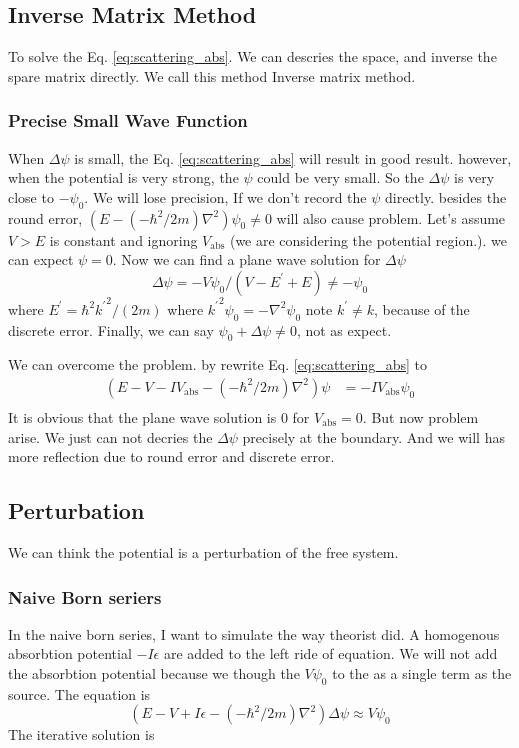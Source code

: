 \documentclass[12pt,twoside]{article}
\begin{document}
\subsection{Inverse Matrix Method}
To solve the Eq. \ref{eq:scattering_abs}. We can descries the space, and inverse the spare matrix directly. We call this method Inverse matrix method.


\subsubsection{Precise Small Wave Function}
When $\Delta \psi$ is small, the Eq. \ref{eq:scattering_abs} will result in good result. however, when the potential is very strong, the $\psi$ could be very small. So the $\Delta \psi$ is very close to $-\psi_0$. We will lose precision, If we don't record the $\psi$ directly. besides the round error, $(E-(-\hbar^2/2m)\nabla^2)\psi_0 \neq 0$ will also cause problem. Let's assume $V > E$ is constant and ignoring $V_\text{abs}$ (we are considering the potential region.). we can expect $\psi=0$. Now we can find a plane wave solution for $\Delta\psi$
$$
\Delta\psi = -V\psi_0/(V-E^\prime+E) \neq -\psi_0
$$
where $E^\prime =\hbar^2 {k^\prime}^2 / (2m)$
where ${k^\prime}^2 \psi_0 = -\nabla^2\psi_0$
note $k^\prime\neq k$, because of the discrete error. Finally, we can say $\psi_0+\Delta\psi\neq 0$, not as expect.

We can overcome the problem. by rewrite Eq. \ref{eq:scattering_abs} to
\begin{align}\label{eq:scattering_abs_psi}
(E - V - IV_\text{abs} -(-\hbar^2/2m)\nabla^2)\psi &= -IV_\text{abs}\psi_0\\ \label{eq:scattering_boundary_abs}
\end{align}
It is obvious that the plane wave solution is $0$ for $V_\text{abs} = 0$. But now problem arise. We just can not decries the $\Delta\psi$ precisely at the boundary. And we will has more reflection due to round error and discrete error.




\subsection{Perturbation}
We can think the potential is a perturbation of the free system.


\subsubsection{Naive Born seriers}
In the naive born series, I want to simulate the way theorist did.
A homogenous absorbtion potential $-I\epsilon$ are added to the left ride of equation.
We will not add the absorbtion potential because we though the $V\psi_0$ to the as a single term as the source.
The equation is
$$
(E -V + I\epsilon - (-\hbar^2/2m)\nabla^2)\Delta\psi \approx V\psi_0
$$
The iterative solution is
\end{document}
